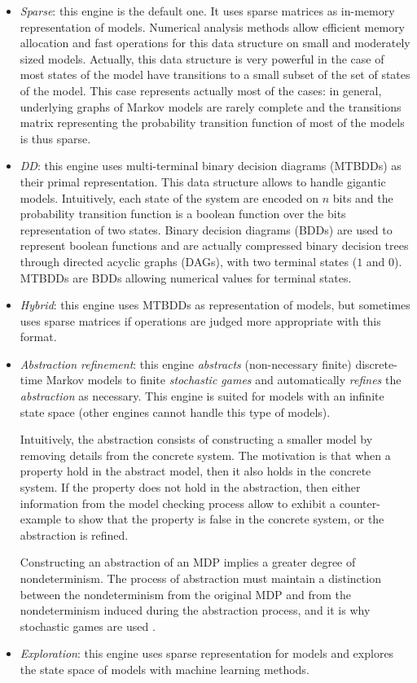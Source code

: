\begin{itemize}
  \item \textit{Sparse}: this engine is the default one. It uses sparse matrices as in-memory representation of models. Numerical analysis methods allow efficient memory allocation and fast operations for this data structure on small and moderately sized models.
  Actually, this data structure is very powerful in the case of most states of the model have transitions to a small subset of the set of states of the model. This case represents actually most of the cases: in general, underlying graphs of Markov models are rarely complete and the transitions matrix representing the probability transition function of
  most of the models is thus sparse.
  \item \textit{DD}: this engine uses multi-terminal binary decision diagrams (MTBDDs) as their primal representation. This data structure allows
  to handle gigantic models. Intuitively, each state of the system are encoded on $n$ bits and the probability transition function is a boolean function
  over the bits representation of two states. Binary decision diagrams (BDDs) are
  used to represent boolean functions and are actually compressed binary decision trees through directed acyclic graphs (DAGs), with two terminal states ($1$ and $0$). MTBDDs are BDDs allowing numerical values for terminal states.
  \item \textit{Hybrid}: this engine uses MTBDDs as representation of models, but sometimes uses sparse matrices if operations are judged more appropriate with this format.
  \item \textit{Abstraction refinement}: this engine \textit{abstracts} (non-necessary finite) discrete-time Markov models to finite \textit{stochastic games} and automatically \textit{refines} the \textit{abstraction} as necessary. This engine is suited for models with an infinite state space (other engines cannot handle this type of models).
  \par Intuitively, the abstraction consists of constructing a smaller model by removing details from the concrete system.
  The motivation is that when a property hold in the abstract model, then it also holds in the concrete system.
  If the property does not hold in the abstraction, then either information from the model checking process allow to exhibit a counter-example to show that the property is false in the concrete system, or the abstraction is refined.
  \par Constructing an abstraction of an MDP implies a greater degree of nondeterminism.
  The process of abstraction must maintain a distinction between the nondeterminism from the original MDP and from the nondeterminism induced during the abstraction process, and it is why stochastic games are used \cite{DBLP:journals/fmsd/KattenbeltKNP10}.
  \item \textit{Exploration}: this engine uses sparse representation for models and explores the state space of models with machine learning methods.
\end{itemize}

